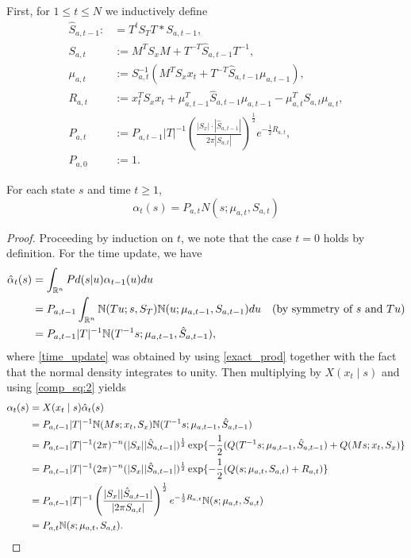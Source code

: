 \documentclass[12pt,leqno]{article}
\begin{document}
  First, for $1\le t \le N$ we inductively define
  \begin{align*}
    \hat{S}_{a,t-1} :&= T^{t}S_TT * S_{a,t-1},\\
    S_{a,t} &:= M^TS_xM  + T^{-T}\hat{S}_{a,t-1}T^{-1},\\
    \mu_{a,t} &:= S_{a,t}^{-1}(M^TS_xx_t + T^{-T}\hat{S}_{a,t-1}\mu_{a,t-1}),\\
    R_{a,t} &:= x_t^TS_xx_t + \mu_{a,t-1}^T\hat{S}_{a,t-1}\mu_{a,t-1} - \mu_{a,t}^TS_{a,t}\mu_{a,t},\\
    P_{a,t} &:= P_{a,t-1}|T|^{-1}\left(\frac{|S_x|\cdot|\hat{S}_{a,t-1}|}{2\pi|S_{a,t}|}\right)^{\frac{1}{2}}e^{-\frac{1}{2}R_{a,t}},\\
    P_{a,0} &:= 1.
  \end{align*}

\begin{Thm}\label{alpha:1}
  For each state $s$ and time $t \ge 1$,
$$
  \alpha_t(s) = P_{a,t}N(s;\mu_{a,t},S_{a,t})
$$
\end{Thm}

\begin{proof}

Proceeding by induction on $t$, we note that the case $t = 0$ holds by definition.
For the time update, we have
\begin{align}
  \hat{\alpha}_t(s) &= \int_{\R^n}Pd(s|u)\alpha_{t-1}(u)du \notag \\
  &= P_{a,t-1}\int_{\R^n}\N(Tu;s,S_T)\N(u;\mu_{a,t-1},S_{a,t-1})du \quad\text{(by symmetry of $s$ and $Tu$)}\notag\\
  &= P_{a,t-1}|T|^{-1}\N(T^{-1}s;\mu_{a,t-1},\hat{S}_{a,t-1}),\label{time_update} %
\end{align}
where \eqref{time_update} was obtained by using \eqref{exact_prod} together with the fact that the normal
density integrates to unity.  Then multiplying by $X(x_t\mid s)$ and using \eqref{comp_sq:2} yields
\begin{align*}
  \alpha_t(s) &= X(x_t\mid s)\hat{\alpha}_t(s) \\
  &= P_{a,t-1}|T|^{-1}{\mathbb N}(Ms;x_t,S_x){\mathbb N}(T^{-1}s;\mu_{a,t-1},\hat{S}_{a,t-1}) \\
  &= P_{a,t-1}|T|^{-1}(2\pi)^{-n}(|S_x||\hat{S}_{a,t-1}|)^{\frac{1}{2}}\exp\{-\frac{1}{2}(Q(T^{-1}s;
  \mu_{a,t-1},\hat{S}_{a,t-1}) + Q(Ms;x_t,S_x)\} \\
  &= P_{a,t-1}|T|^{-1}(2\pi)^{-n}(|S_x||\hat{S}_{a,t-1}|)^{\frac{1}{2}}\exp\{-\frac{1}{2}(Q(s;\mu_{a,t},S_{a,t}) + R_{a,t})\}\\
  &= P_{a,t-1}|T|^{-1}\left(\frac{|S_x||\hat{S}_{a,t-1}|}{|2\pi S_{a,t}|}\right)^{\frac{1}{2}}e^{-\frac{1}{2}R_{a,t}}
  {\mathbb N}(s;\mu_{a,t},S_{a,t})\\
  &= P_{a,t}{\mathbb N}(s;\mu_{a,t},S_{a,t}).
\end{align*}
\end{proof}
\end{document}
